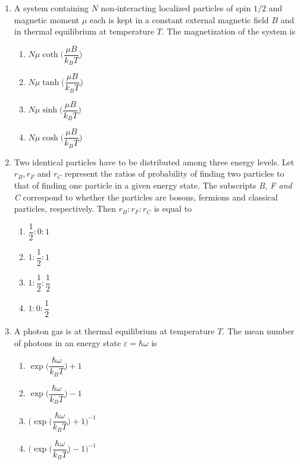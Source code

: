 \documentclass[journal,12pt,onecolumn]{IEEEtran}
\theoremstyle{remark}
\begin{document}
\begin{enumerate}
\item A system containing $N$ non-interacting localized particles of spin $1/2$ and magnetic moment $\mu$ each is kept in a constant external magnetic field $B$ and in thermal equilibrium at temperature $T$. The magnetization of the system is
\hfill{}
\begin{multicols}{2}
\begin{enumerate}
    \item $N\mu\coth\biggl(\dfrac{\mu B}{k_B T}\biggr)$
    \item $N\mu\tanh\biggl(\dfrac{\mu B}{k_B T}\biggr)$
    \item $N\mu\sinh\biggl(\dfrac{\mu B}{k_B T}\biggr)$
    \item $N\mu\cosh\biggl(\dfrac{\mu B}{k_B T}\biggr)$
\end{enumerate}
\end{multicols}
\item Two identical particles have to be distributed among three energy levels. Let $r_B,r_F$ and $r_C$ represent the ratios of probability of finding two particles to that of finding one particle in a given energy state. The subscripts \textit{B, F and C} correspond to whether the particles are bosons, fermions and classical particles, respectively. Then $r_B : r_F : r_C$ is equal to
\hfill{}
\begin{multicols}{4}
\begin{enumerate}
    \item $\dfrac{1}{2} : 0 : 1$
    \item $1 : \dfrac{1}{2} : 1$
    \item $1 : \dfrac{1}{2} : \dfrac{1}{2}$
    \item $1 : 0 : \dfrac{1}{2}$
\end{enumerate}
\end{multicols}
\item A photon gas is at thermal equilibrium at temperature $T$. The mean number of photons in an energy state $\varepsilon = \hbar\omega$ is
\hfill{}
\begin{multicols}{4}
\begin{enumerate}
    \item $\exp\biggl(\dfrac{\hbar\omega}{k_B T}\biggr)+1$
    \item $\exp\biggl(\dfrac{\hbar\omega}{k_B T}\biggr)-1$
    \item $\biggl(\exp\biggl(\dfrac{\hbar\omega}{k_B T}\biggr)+1\biggr)^{-1}$
    \item $\biggl(\exp\!\biggl(\dfrac{\hbar\omega}{k_B T}\biggr)-1\biggr)^{-1}$
\end{enumerate}
\end{multicols}


\end{enumerate}
\end{document}

